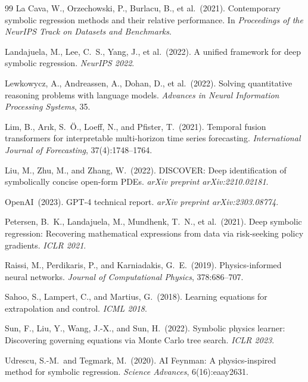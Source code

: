 \documentclass[twoside,11pt]{article}
\begin{document}
\begin{thebibliography}{99}
La Cava, W., Orzechowski, P., Burlacu, B., et al.\ (2021).
Contemporary symbolic regression methods and their relative performance.
In \emph{Proceedings of the NeurIPS Track on Datasets and Benchmarks}.

Landajuela, M., Lee, C.~S., Yang, J., et al.\ (2022).
A unified framework for deep symbolic regression.
\emph{NeurIPS 2022}.

Lewkowycz, A., Andreassen, A., Dohan, D., et al.\ (2022).
Solving quantitative reasoning problems with language models.
\emph{Advances in Neural Information Processing Systems}, 35.

Lim, B., Ar{\i}k, S.~{\"{O}}., Loeff, N., and Pfister, T.\ (2021).
Temporal fusion transformers for interpretable multi-horizon time series forecasting.
\emph{International Journal of Forecasting}, 37(4):1748--1764.

Liu, M., Zhu, M., and Zhang, W.\ (2022).
DISCOVER: Deep identification of symbolically concise open-form PDEs.
\emph{arXiv preprint arXiv:2210.02181}.

OpenAI\ (2023).
GPT-4 technical report.
\emph{arXiv preprint arXiv:2303.08774}.

Petersen, B.~K., Landajuela, M., Mundhenk, T.~N., et al.\ (2021).
Deep symbolic regression: Recovering mathematical expressions from data via
risk-seeking policy gradients.
\emph{ICLR 2021}.

Raissi, M., Perdikaris, P., and Karniadakis, G.~E.\ (2019).
Physics-informed neural networks.
\emph{Journal of Computational Physics}, 378:686--707.

Sahoo, S., Lampert, C., and Martius, G.\ (2018).
Learning equations for extrapolation and control.
\emph{ICML 2018}.

Sun, F., Liu, Y., Wang, J.-X., and Sun, H.\ (2022).
Symbolic physics learner: Discovering governing equations via Monte Carlo tree search.
\emph{ICLR 2023}.

Udrescu, S.-M.\ and Tegmark, M.\ (2020).
AI Feynman: A physics-inspired method for symbolic regression.
\emph{Science Advances}, 6(16):eaay2631.


\end{thebibliography}
\end{document}
